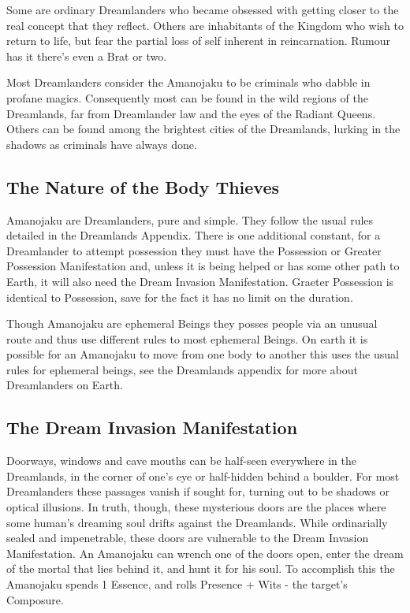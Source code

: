 Some are ordinary Dreamlanders who became obsessed with getting closer to the real concept that they reflect. Others are inhabitants of the Kingdom who wish to return to life, but fear the partial loss of self inherent in reincarnation. Rumour has it there's even a Brat or two.

Most Dreamlanders consider the Amanojaku to be criminals who dabble in profane magics. Consequently most can be found in the wild regions of the Dreamlands, far from Dreamlander law and the eyes of the Radiant Queens. Others can be found among the brightest cities of the Dreamlands, lurking in the shadows as criminals have always done. 

\subsection*{The Nature of the Body Thieves}

Amanojaku are Dreamlanders, pure and simple. They follow the usual rules detailed in the Dreamlands Appendix. There is one additional constant, for a Dreamlander to attempt possession they must have the Possession or Greater Possession Manifestation and, unless it is being helped or has some other path to Earth, it will also need the Dream Invasion Manifestation. Graeter Possession is identical to Possession, save for the fact it has no limit on the duration. 

Though Amanojaku are ephemeral Beings they posses people via an unusual route and thus use different rules to most ephemeral Beings. On earth it is possible for an Amanojaku to move from one body to another this uses the usual rules for ephemeral beings, see the Dreamlands appendix for more about Dreamlanders on Earth. 

\subsection*{The Dream Invasion Manifestation}

Doorways, windows and cave mouths can be half-seen everywhere in the Dreamlands, in the corner of one's eye or half-hidden behind a boulder. For most Dreamlanders these passages vanish if sought for, turning out to be shadows or optical illusions. In truth, though, these mysterious doors are the places where some human's dreaming soul drifts against the Dreamlands. While ordinarially sealed and impenetrable, these doors are vulnerable to the Dream Invasion Manifestation. An Amanojaku can wrench one of the doors open, enter the dream of the mortal that lies behind it, and hunt it for his soul. To accomplish this the Amanojaku spends 1 Essence, and rolls Presence + Wits - the target's Composure.

